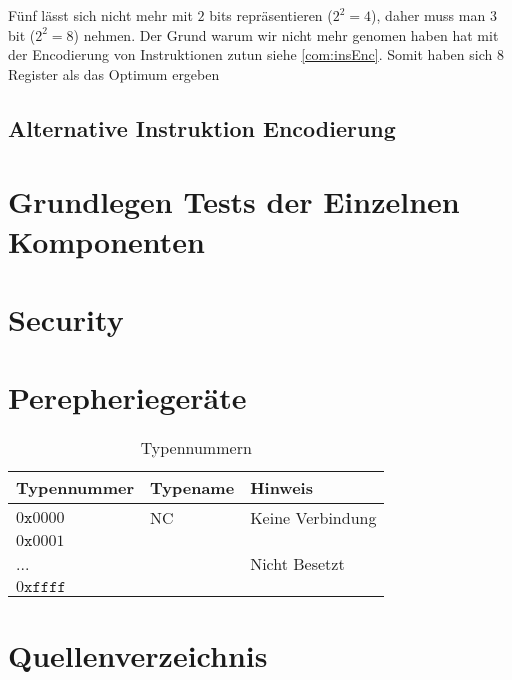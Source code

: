 \documentclass{scrartcl}
\begin{document}
Fünf lässt sich nicht mehr mit $2$ bits repräsentieren ($2^2 = 4$), daher muss man $3$ bit ($2^2 = 8$) nehmen. Der Grund warum wir nicht mehr genomen haben hat mit der Encodierung von Instruktionen zutun siehe \autoref{com:insEnc}. Somit haben sich $8$ Register als das Optimum ergeben

\subsection{\label{com:insEnc}Alternative Instruktion Encodierung}

\section{Grundlegen Tests der Einzelnen Komponenten}

\section{\label{section:security}Security}

\section{\label{section:devices}Perepheriegeräte}

\begin{center}
	\begin{table}
		\caption{\label{table:device_types}Typennummern}
		\begin{tabular}{ l | l | l}
			Typennummer & Typename & Hinweis \\
			\hline
			$0\texttt{x}0000$ & NC & Keine Verbindung \\
			$0\texttt{x}0001$ & & \\
			... & & Nicht Besetzt \\
			$0\texttt{xffff}$ & & \\
		\end{tabular}
	\end{table}
\end{center}

\section{Quellenverzeichnis}

\printbibliography{}
\end{document}
